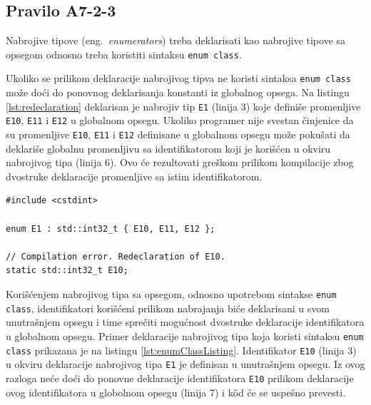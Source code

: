 \documentclass[12pt,oneside]{memoir}
\begin{document}
\subsection{Pravilo A7-2-3}
\begin{center}
\begin{tcolorbox}
Nabrojive tipove (eng.~\textit{enumerators}) treba deklarisati kao nabrojive tipove sa opsegom odnosno treba koristiti sintaksu \texttt{enum class}.
\end{tcolorbox}
\end{center}

Ukoliko se prilikom deklaracije nabrojivog tipva ne koristi sintaksa \texttt{enum class} mo\v{z}e do\'{c}i do ponovnog deklarisanja konstanti iz
globalnog opsega. Na listingu \ref{lst:redeclaration} deklarisan je nabrojiv tip \texttt{E1} (linija 3) koje defini\v{s}e promenljive \texttt{E10}, \texttt{E11}
i \texttt{E12} u globalnom opsegu. Ukoliko programer nije svestan \v{c}injenice da su promenljive \texttt{E10}, \texttt{E11}
i \texttt{E12} definisane u globalnom opsegu mo\v{z}e poku\v{s}ati da deklari\v{s}e globalnu promenljivu sa identifikatorom koji je kori\v{s}\'{c}en u okviru nabrojivog tipa (linija 6). Ovo \'{c}e rezultovati gre\v{s}kom prilikom kompilacije zbog dvostruke deklaracije promenljive sa istim identifikatorom.

\begin{lstlisting}[style=customc, caption={Primer koda u okviru kog dolazi do dvostruke deklaracije promenljive sa istim identifikatorom.}, label=lst:redeclaration]
#include <cstdint>

enum E1 : std::int32_t { E10, E11, E12 };

// Compilation error. Redeclaration of E10.
static std::int32_t E10; 
\end{lstlisting}
Kori\v{s}\'{c}enjem nabrojivog tipa sa opsegom, odnosno upotrebom sintakse \texttt{enum class}, identifikatori kori\v{s}\'{c}eni prilikom
nabrajanja bi\'{c}e deklarisani u svom unutra\v{s}njem opsegu i time spre\v{c}iti mogu\'{c}nost dvostruke deklaracije identifikatora u globalnom opsegu. Primer deklaracije nabrojivog tipa koja koristi sintaksu \texttt{enum class} prikazana je na listingu \ref{lst:enumClassListing}. Identifikator \texttt{E10} (linija 3)
u okviru deklaracije nabrojivog tipa \texttt{E1} je definisan u unutra\v{s}njem opsegu. Iz ovog razloga ne\'{c}e do\'{c}i do ponovne deklaracije identifikatora
\texttt{E10} prilikom deklaracije ovog identifikatora u globolnom opsegu (linija 7) i k\^{o}d \'{c}e se uspe\v{s}no prevesti.
\end{document}
